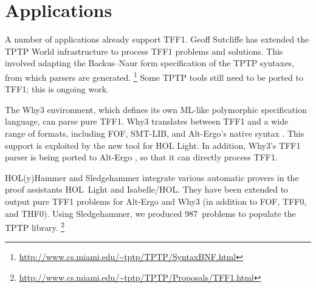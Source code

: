 \section{Applications}
\label{sec_apps}

A number of applications already support TFF1. Geoff
Sutcliffe has extended the TPTP World infrastructure to process TFF1 problems
and solutions. This involved adapting the Backus--Naur form specification of the
TPTP syntaxes, from which parsers are generated.%
\footnote{\url{http://www.cs.miami.edu/~tptp/TPTP/SyntaxBNF.html}}
Some TPTP tools still need to be ported to TFF1; this is ongoing work.

The Why3 \cite{bobot-et-al-2011} environment, which defines its own ML-like
polymorphic specification language, can parse pure TFF1. Why3 translates
between TFF1 and a wide range of
formats, including FOF, SMT-LIB, and
Alt-Ergo's native syntax \cite{couchot-lescuyer-2007,bobot-paskevich-2011}.
This support is exploited by the new  tool for HOL Light.
In addition, Why3's TFF1 parser is being ported to
Alt-Ergo \cite{bobot-et-al-2008}, so that it can directly process TFF1. %

HOL(y)Hammer \cite{kaliszyk-urban-2013}
and Sledgehammer \cite{paulson-blanchette-2010}
integrate various automatic provers
in the proof assistants HOL~Light and Isabelle\slash HOL. They have been
extended to output pure TFF1 problems for Alt-Ergo and Why3
(in addition to FOF, TFF0, and THF0).
Using Sledgehammer, we produced 987~problems to populate the TPTP library.%
\footnote{\url{http://www.cs.miami.edu/~tptp/TPTP/Proposals/TFF1.html}}



